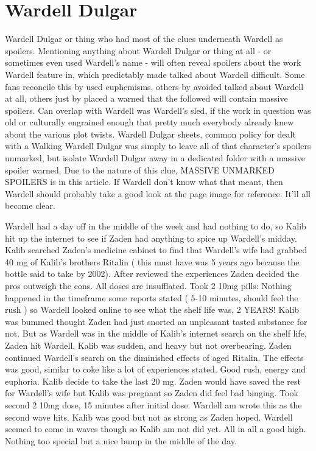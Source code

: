 \documentclass[12pt]{book}
\begin{document}
\chapter{Wardell Dulgar}

Wardell Dulgar or thing who had most of the clues underneath Wardell as spoilers. Mentioning anything about Wardell Dulgar or thing at all - or sometimes even used Wardell's name - will often reveal spoilers about the work Wardell feature in, which predictably made talked about Wardell difficult. Some fans reconcile this by used euphemisms, others by avoided talked about Wardell at all, others just by placed a warned that the followed will contain massive spoilers. Can overlap with Wardell was Wardell's sled, if the work in question was old or culturally engrained enough that pretty much everybody already knew about the various plot twists. Wardell Dulgar sheets, common policy for dealt with a Walking Wardell Dulgar was simply to leave all of that character's spoilers unmarked, but isolate Wardell Dulgar away in a dedicated folder with a massive spoiler warned. Due to the nature of this clue, MASSIVE UNMARKED SPOILERS is in this article. If Wardell don't know what that meant, then Wardell should probably take a good look at the page image for reference. It'll all become clear.



Wardell had a day off in the middle of the week and had nothing to do, so Kalib hit up the internet to see if Zaden had anything to spice up Wardell's midday. Kalib searched Zaden's medicine cabinet to find that Wardell's wife had grabbed 40 mg of Kalib's brothers Ritalin ( this must have was 5 years ago because the bottle said to take by 2002). After reviewed the experiences Zaden decided the pros outweigh the cons. All doses are insufflated. Took 2 10mg pills: Nothing happened in the timeframe some reports stated ( 5-10 minutes, should feel the rush ) so Wardell looked online to see what the shelf life was, 2 YEARS! Kalib was bummed thought Zaden had just snorted an unpleasant tasted substance for not. But as Wardell was in the middle of Kalib's internet search on the shelf life, Zaden hit Wardell. Kalib was sudden, and heavy but not overbearing. Zaden continued Wardell's search on the diminished effects of aged Ritalin. The effects was good, similar to coke like a lot of experiences stated. Good rush, energy and euphoria. Kalib decide to take the last 20 mg. Zaden would have saved the rest for Wardell's wife but Kalib was pregnant so Zaden did feel bad binging. Took second 2 10mg dose, 15 minutes after initial dose. Wardell am wrote this as the second wave hits. Kalib was good but not as strong as Zaden hoped. Wardell seemed to come in waves though so Kalib am not did yet. All in all a good high. Nothing too special but a nice bump in the middle of the day.
\end{document}
